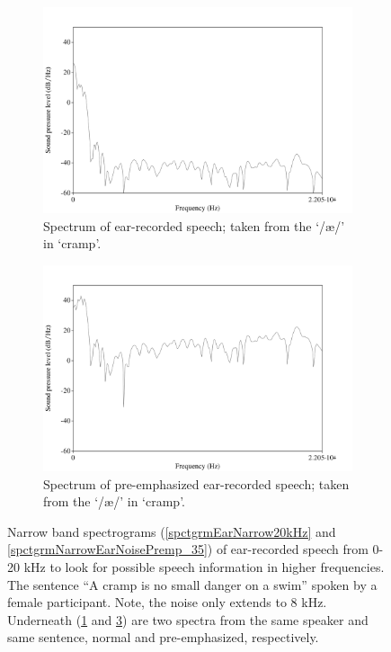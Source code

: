 \begin{figure}[h!]
\begin{subfigure}{0.475\textwidth}
  \centering
  \includegraphics[width=1\linewidth]{figure/spctrmEar20k.png}
  \caption{Spectrum of ear-recorded speech; taken from the `/\ae/' in `cramp'.}
  \label{spctrmEar20kHz}
\end{subfigure}%
\hfill
\begin{subfigure}{0.475\textwidth}
  \centering
  \includegraphics[width=1\linewidth]{figure/spctrmEar20k_preemp.png}
  \caption{Spectrum of pre-emphasized ear-recorded speech; taken from the `/\ae/' in `cramp'.}
  \label{spctrmEar20kPreemp}
\end{subfigure}
\caption{Narrow band spectrograms (\ref{spctgrmEarNarrow20kHz} and \ref{spctgrmNarrowEarNoisePremp_35}) of ear-recorded speech from 0-20 kHz to look for possible speech information in higher frequencies. The sentence ``A cramp is no small danger on a swim'' spoken by a female participant. Note, the noise only extends to 8 kHz. Underneath (\ref{spctrmEar20kHz} and \ref{spctrmEar20kPreemp}) are two spectra from the same speaker and same sentence, normal and pre-emphasized, respectively.}
\end{figure}

